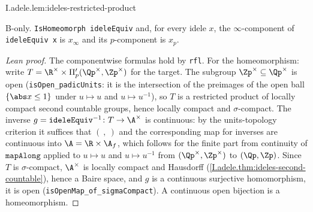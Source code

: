 \begin{lemma}
\bonly
{}
\end{lemma}
\begin{tfformal}{I.adele.lem:ideles-restricted-product}
\begin{tffidelity}
B-only. \texttt{IsHomeomorph ideleEquiv} and, for every idele $x$, the $\infty$-component of \texttt{ideleEquiv x} is $x_\infty$ and its $p$-component is $x_p$.
\end{tffidelity}
\end{tfformal}
\begin{proof}[Lean proof]
The componentwise formulas hold by \texttt{rfl}. For the homeomorphism: write $T=\R^\times\times\Pi'_p(\Qp^\times,\Zp^\times)$ for the target. The subgroup $\Zp^\times\subseteq\Qp^\times$ is open (\texttt{isOpen\_padicUnits}: it is the intersection of the preimages of the open ball $\{\abs x\le1\}$ under $u\mapsto u$ and $u\mapsto u^{-1}$), so $T$ is a restricted product of locally compact second countable groups, hence locally compact and $\sigma$-compact. The inverse $g=\texttt{ideleEquiv}^{-1}\colon T\to\A^\times$ is continuous: by the units-topology criterion it suffices that $(\ ,\ )$ and the corresponding map for inverses are continuous into $\A=\R\times\A_f$, which follows for the finite part from continuity of $\texttt{mapAlong}$ applied to $u\mapsto u$ and $u\mapsto u^{-1}$ from $(\Qp^\times,\Zp^\times)$ to $(\Qp,\Zp)$. Since $T$ is $\sigma$-compact, $\A^\times$ is locally compact and Hausdorff (\cref{I.adele.thm:ideles-second-countable}), hence a Baire space, and $g$ is a continuous surjective homomorphism, it is open (\texttt{isOpenMap\_of\_sigmaCompact}). A continuous open bijection is a homeomorphism.
\end{proof}

